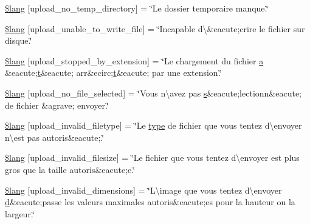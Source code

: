 \begin{DoxyCompactItemize}
\item 
\hyperlink{application_2language_2french_2upload__lang_8php_ac7144f4992346816875bac28488ef715}{\$lang} \mbox{[}\textquotesingle{}upload\+\_\+no\+\_\+temp\+\_\+directory\textquotesingle{}\mbox{]} = \char`\"{}Le dossier temporaire manque.\char`\"{}
\item 
\hyperlink{application_2language_2french_2upload__lang_8php_a620b622468d4e7781fed6316440c85e7}{\$lang} \mbox{[}\textquotesingle{}upload\+\_\+unable\+\_\+to\+\_\+write\+\_\+file\textquotesingle{}\mbox{]} = \char`\"{}Incapable d\textbackslash{}\textquotesingle{}\&eacute;crire le fichier sur disque.\char`\"{}
\item 
\hyperlink{application_2language_2french_2upload__lang_8php_ae97257deea3dddb33be4bbc6510a464b}{\$lang} \mbox{[}\textquotesingle{}upload\+\_\+stopped\+\_\+by\+\_\+extension\textquotesingle{}\mbox{]} = \char`\"{}Le chargement du fichier \hyperlink{_chart_8min_8js_aef3b685c08bc6c76c8e729bd0e93901d}{a} \&eacute;\hyperlink{jquery-ui_8min_8js_acf335ef347969ef6dc8387e680fb289e}{t}\&eacute; arr\&ecirc;\hyperlink{jquery-ui_8min_8js_acf335ef347969ef6dc8387e680fb289e}{t}\&eacute; par une extension.\char`\"{}
\item 
\hyperlink{application_2language_2french_2upload__lang_8php_a88d8e8f9b879d1c25e6c089f3d3b5a30}{\$lang} \mbox{[}\textquotesingle{}upload\+\_\+no\+\_\+file\+\_\+selected\textquotesingle{}\mbox{]} = \char`\"{}Vous n\textbackslash{}\textquotesingle{}avez pas \hyperlink{paste_2plugin_8min_8js_a43ae144ee2a4e493fea41ca42f795b14}{s}\&eacute;lectionn\&eacute; de fichier \&agrave; envoyer.\char`\"{}
\item 
\hyperlink{application_2language_2french_2upload__lang_8php_ac8631aa85ed80396bd78e91a76d5fd38}{\$lang} \mbox{[}\textquotesingle{}upload\+\_\+invalid\+\_\+filetype\textquotesingle{}\mbox{]} = \char`\"{}Le \hyperlink{_ossn_wall_2actions_2wall_2post_2group_8php_a2dc1bb4e1ed0029daa81ac0776b14b51}{type} de fichier que vous tentez d\textbackslash{}\textquotesingle{}envoyer n\textbackslash{}\textquotesingle{}est pas autoris\&eacute;.\char`\"{}
\item 
\hyperlink{application_2language_2french_2upload__lang_8php_a832b3ec1d84b1d48a488cf525954d8f2}{\$lang} \mbox{[}\textquotesingle{}upload\+\_\+invalid\+\_\+filesize\textquotesingle{}\mbox{]} = \char`\"{}Le fichier que vous tentez d\textbackslash{}\textquotesingle{}envoyer est plus gros que la taille autoris\&eacute;e.\char`\"{}
\item 
\hyperlink{application_2language_2french_2upload__lang_8php_a4e796eeccf7df90acffea7884a5bd558}{\$lang} \mbox{[}\textquotesingle{}upload\+\_\+invalid\+\_\+dimensions\textquotesingle{}\mbox{]} = \char`\"{}L\textbackslash{}\textquotesingle{}image que vous tentez d\textbackslash{}\textquotesingle{}envoyer \hyperlink{fullpage_2plugin_8min_8js_a86138ad7596633fd5f960ad9c40f8862}{d}\&eacute;passe les valeurs maximales autoris\&eacute;es pour la hauteur ou la largeur.\char`\"{}

\end{DoxyCompactItemize}
